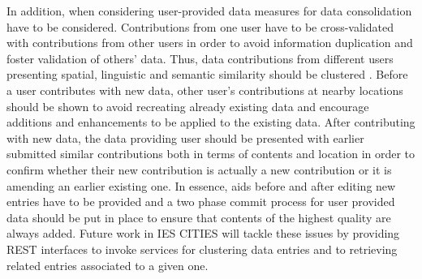 In addition, when considering user-provided data measures for data consolidation have to be considered. Contributions from one user have to be cross-validated with contributions from other users in order to avoid information duplication and foster validation of others' data. Thus, data contributions from different users presenting spatial, linguistic and semantic similarity should be clustered \cite{braun_collaborative_2010}. Before a user contributes with new data, other user's contributions at nearby locations should be shown to avoid recreating already existing data and encourage additions and enhancements to be applied to the existing data. After contributing with new data, the data providing user should be presented with earlier submitted similar contributions both in terms of contents and location in order to confirm whether their new contribution is actually a new contribution or it is amending an earlier existing one. In essence, aids before and after editing new entries have to be provided and a two phase commit process for user provided data should be put in place to ensure that contents of the highest quality are always added. Future work in IES CITIES will tackle these issues by providing REST interfaces to invoke services for clustering data entries and to retrieving related entries associated to a given one.
